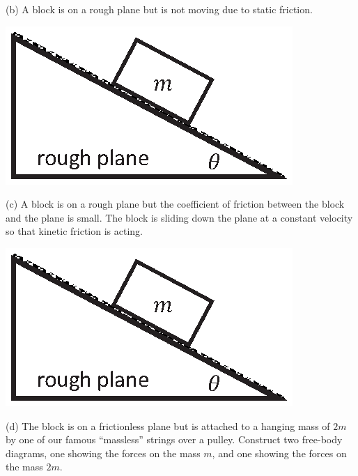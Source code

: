 (b) A block is on a rough plane but is not moving due to static friction.

\vspace{0.3cm}
{\par\centering \includegraphics{friction/rough_plane.eps} \par}

(c) A block is on a rough plane but the coefficient of friction between the
block and the plane is small. The block is sliding down the plane at a constant
velocity so that kinetic friction is acting.

\vspace{0.3cm}
{\par\centering \includegraphics{friction/rough_plane.eps} \par}

\pagebreak[2]
(d) The block is on a frictionless plane but is attached to a hanging mass of
$2m$ by one of our famous ``massless'' strings over a pulley.
Construct two free-body diagrams, one showing the forces on the mass $m$, and one showing the forces
on the mass $2m$.

